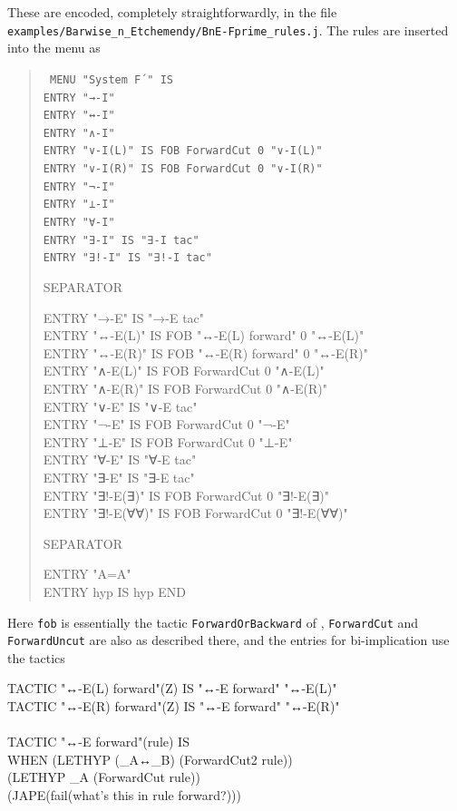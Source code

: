 These are encoded, completely straightforwardly, in the file \texttt{examples/Barwise\_n\_Etchemendy/BnE-Fprime\_rules.j}. The rules are inserted into the menu as
\begin{quote}\tt\small
MENU "System F´" IS\\
\tab ENTRY "→-I" \\
\tab ENTRY "↔-I"\\
\tab ENTRY "∧-I" \\
\tab ENTRY "∨-I(L)" IS FOB ForwardCut 0 "∨-I(L)"\\
\tab ENTRY "∨-I(R)" IS FOB ForwardCut 0 "∨-I(R)"\\
\tab ENTRY "¬-I"\\
\tab ENTRY "⊥-I"\\
\tab ENTRY "∀-I"\\
\tab ENTRY "∃-I" IS "∃-I tac"\\
\tab ENTRY "∃!-I" IS "∃!-I tac"

\tab SEPARATOR

\tab ENTRY "→-E"     IS "→-E tac" \\
\tab ENTRY "↔-E(L)"  IS FOB "↔-E(L) forward" 0 "↔-E(L)" \\
\tab ENTRY "↔-E(R)"  IS FOB "↔-E(R) forward" 0 "↔-E(R)" \\
\tab ENTRY "∧-E(L)"  IS FOB ForwardCut 0 "∧-E(L)"\\
\tab ENTRY "∧-E(R)"  IS FOB ForwardCut 0 "∧-E(R)"\\
\tab ENTRY "∨-E"     IS "∨-E tac"    \\
\tab ENTRY "¬-E"     IS FOB ForwardCut 0 "¬-E"   \\
\tab ENTRY "⊥-E"     IS FOB ForwardCut 0 "⊥-E"   \\
\tab ENTRY "∀-E"     IS "∀-E tac"    \\
\tab ENTRY "∃-E"     IS "∃-E tac"\\
\tab ENTRY "∃!-E(∃)" IS FOB ForwardCut 0 "∃!-E(∃)"\\
\tab ENTRY "∃!-E(∀∀)"    IS FOB ForwardCut 0 "∃!-E(∀∀)"

\tab SEPARATOR

\tab ENTRY "A=A"\\
\tab ENTRY hyp       IS hyp
END
\end{quote}

Here \texttt{fob} is essentially the tactic \texttt{ForwardOrBackward} of , \texttt{ForwardCut} and \texttt{ForwardUncut} are also as described there, and the entries for bi-implication use the tactics
\begin{japeish}
TACTIC "↔-E(L) forward"(Z) IS "↔-E forward" "↔-E(L)" \\
TACTIC "↔-E(R) forward"(Z) IS "↔-E forward" "↔-E(R)"\\
\\
TACTIC "↔-E forward"(rule) IS\\
\tab WHEN (LETHYP (\_A↔\_B) (ForwardCut2 rule))\\
\tab \tab (LETHYP \_A (ForwardCut rule))\\
\tab \tab (JAPE(fail(what's this in rule forward?)))
\end{japeish}

